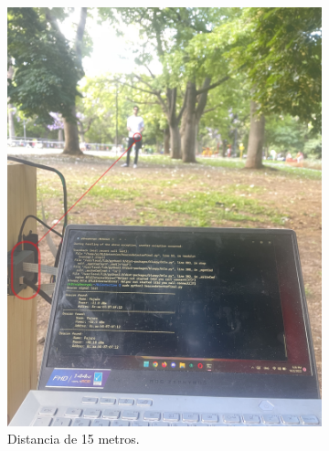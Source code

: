 \begin{figure}[H]
	\centering
	\ContinuedFloat
	\begin{subfigure}{0.3\textwidth}
		\centering
		\includegraphics[width=\linewidth]{ImagenesValidacion del prototipo/TINTCOM12ba}		
		\caption{Distancia de 15 metros.}
	\end{subfigure}\hspace*{2.5cm}
	\begin{subfigure}{0.3\textwidth}
		\centering

\end{subfigure}
\end{figure}
